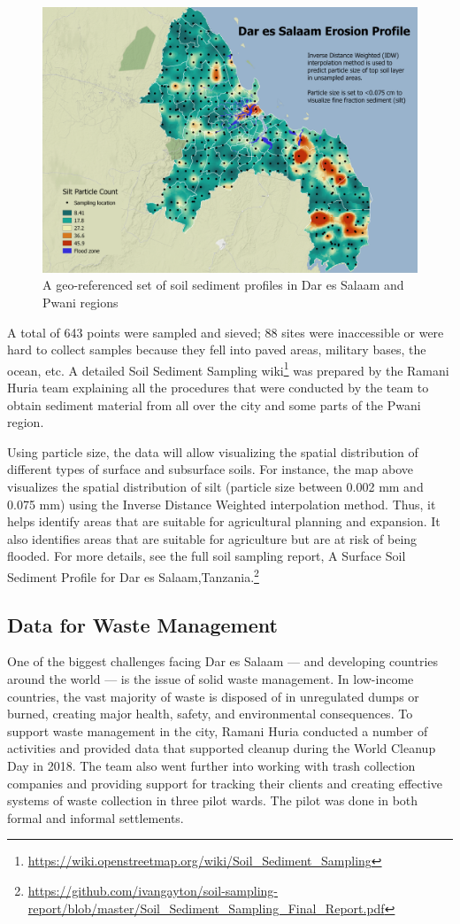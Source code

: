 \documentclass[a4paper,12pt,twoside]{article}
\begin{document}
\begin{figure}[h]
    \centering
    \includegraphics[width=.6\textwidth]{images/erosion_Sep26_min.png}
    \caption{A geo-referenced set of soil sediment profiles in Dar es Salaam and Pwani regions}
\end{figure}

\begin{multicols}{2}
A total of 643 points were sampled and sieved; 88 sites were inaccessible or were hard to collect samples because they fell into paved areas, military bases, the ocean, etc. A detailed Soil Sediment Sampling wiki\footnote{\url{ https://wiki.openstreetmap.org/wiki/Soil_Sediment_Sampling}} was prepared by the Ramani Huria team explaining all the procedures that were conducted by the team to obtain sediment material from all over the city and some parts of the Pwani region.

Using particle size, the data will allow visualizing the spatial distribution of different types of surface and subsurface soils. For instance, the map above visualizes the spatial distribution of silt (particle size between 0.002 mm and 0.075 mm) using the Inverse Distance Weighted interpolation method. Thus, it helps identify areas that are suitable for agricultural planning and expansion. It also identifies areas that are suitable for agriculture but are at risk of being flooded. For more details, see the full soil sampling report, A Surface Soil Sediment Profile for Dar es
Salaam,Tanzania.\footnote{\url{https://github.com/ivangayton/soil-sampling-report/blob/master/Soil_Sediment_Sampling_Final_Report.pdf}}
\end{multicols}

\newpage
\subsection{Data for Waste Management}
\begin{multicols}{2}
One of the biggest challenges facing Dar es Salaam — and developing countries around the world — is the issue of solid waste management. In low-income countries, the vast majority of waste is disposed of in unregulated dumps or burned, creating major health, safety, and environmental consequences. To support waste management in the city, Ramani Huria conducted a number of activities and provided data that supported cleanup during the World Cleanup Day in 2018. The team also went further into working with trash collection companies and providing support for tracking their clients and creating effective systems of waste collection in three pilot wards. The pilot was done in both formal and informal settlements.
\end{multicols}
\end{document}
